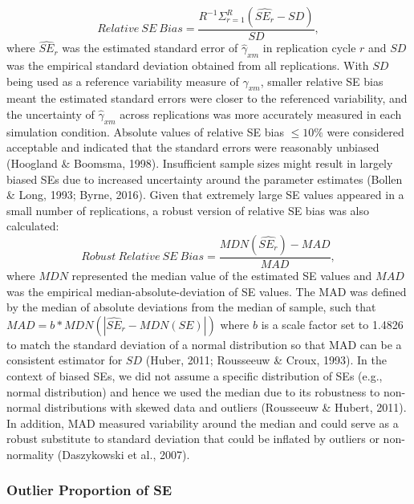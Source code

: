 \documentclass[
  man]{apa6}
\begin{document}
\begin{equation}
Relative\ SE\ Bias = \frac{R^{-1}\Sigma^{R}_{r = 1}(\widehat{SE_{r}} - SD)}{SD},
\end{equation}
where \(\widehat{SE}_{r}\) was the estimated standard error of \(\hat{\gamma}_{xm}\) in replication cycle \(r\) and \(SD\) was the empirical standard deviation obtained from all replications. With \(SD\) being used as a reference variability measure of \(\hat{\gamma}_{xm}\), smaller relative SE bias meant the estimated standard errors were closer to the referenced variability, and the uncertainty of \(\hat{\gamma}_{xm}\) across replications was more accurately measured in each simulation condition. Absolute values of relative SE bias \(\le 10\%\) were considered acceptable and indicated that the standard errors were reasonably unbiased (Hoogland \(\&\) Boomsma, 1998). Insufficient sample sizes might result in largely biased SEs due to increased uncertainty around the parameter estimates (Bollen \& Long, 1993; Byrne, 2016). Given that extremely large SE values appeared in a small number of replications, a robust version of relative SE bias was also calculated:
\begin{equation}
Robust\ Relative\ SE\ Bias = \frac{MDN(\widehat{SE_{r}}) - MAD}{MAD},
\end{equation}
where \(MDN\) represented the median value of the estimated SE values and \(MAD\) was the empirical median-absolute-deviation of SE values. The MAD was defined by the median of absolute deviations from the median of sample, such that \(MAD = b*MDN(|\widehat{SE}_{r} - MDN(SE)|)\) where \(b\) is a scale factor set to 1.4826 to match the standard deviation of a normal distribution so that MAD can be a consistent estimator for \(SD\) (Huber, 2011; Rousseeuw \& Croux, 1993). In the context of biased SEs, we did not assume a specific distribution of SEs (e.g., normal distribution) and hence we used the median due to its robustness to non-normal distributions with skewed data and outliers (Rousseeuw \& Hubert, 2011). In addition, MAD measured variability around the median and could serve as a robust substitute to standard deviation that could be inflated by outliers or non-normality (Daszykowski et al., 2007).

\subsubsection{Outlier Proportion of SE}\label{outlier-proportion-of-se}
\end{document}

